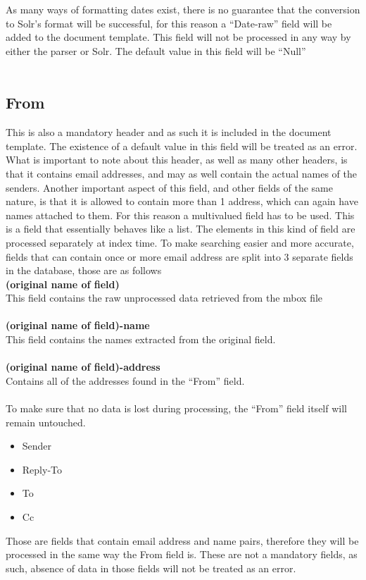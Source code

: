 \documentclass[a4paper,english]{report}
\begin{document}
As many ways of formatting dates exist, there is no guarantee that the conversion to Solr's format will be successful, for this reason a “Date-raw” field will be added to the document template. This field will not be processed in any way by either the parser or Solr.
The default value in this field will be “Null”\\\\

\noindent
\subsection{From}
This is also a mandatory header and as such it is included in the document template.
The existence of a default value in this field will be treated as an error.
What is important to note about this header, as well as many other headers, is that it contains email addresses, and may as well contain the actual names of the senders. Another important aspect of this field, and other fields of the same nature, is that it is allowed to contain more than 1 address, which can again have names attached to them. 
For this reason a multivalued field has to be used. This is a field that essentially behaves like a list. The elements in this kind of field are processed separately at index time.
To make searching easier and more accurate, fields that can contain once or more email address are split into 3 separate fields in the database, those are as follows\\


\noindent
\textbf{(original name of field)}\\
This field contains the raw unprocessed data retrieved from the mbox file\\\\ 
\noindent
\textbf{(original name of field)-name}\\
This field contains the names extracted from the original field.\\\\
\noindent
\textbf{(original name of field)-address}\\ 
\noindent
Contains all of the addresses found in the “From” field.\\\\
\noindent
To make sure that no data is lost during processing, the “From” field itself will remain untouched.

\begin{itemize}
\item Sender
\item Reply-To
\item To
\item Cc
\end{itemize}
Those are fields that contain email address and name pairs, therefore they will be processed in the same way the From field is. These are not a mandatory fields, as such, absence of data in those fields will not be treated as an error.\\
\end{document}
